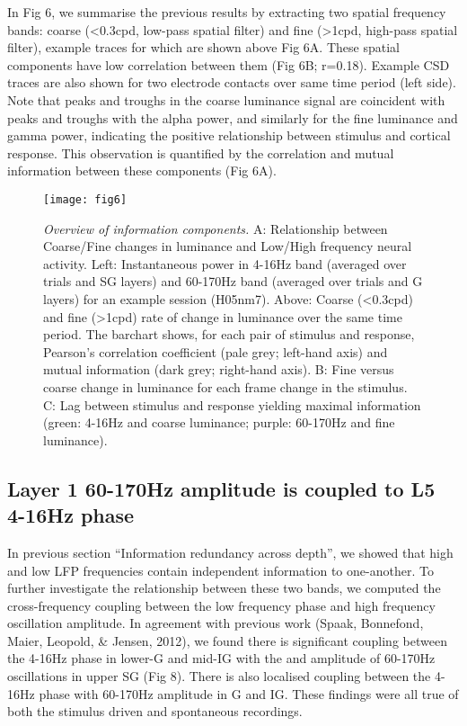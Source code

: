In Fig 6, we summarise the previous results by extracting two spatial frequency bands: coarse ({\textless}0.3cpd, low-pass spatial filter) and fine ({\textgreater}1cpd, high-pass spatial filter), example traces for which are shown above Fig 6A.
These spatial components have low correlation between them (Fig 6B; r=0.18).
Example \ac{CSD} traces are also shown for two electrode contacts over same time period (left side).
Note that peaks and troughs in the coarse luminance signal are coincident with peaks and troughs with the alpha power, and similarly for the fine luminance and gamma power, indicating the positive relationship between stimulus and cortical response.
This observation is quantified by the correlation and mutual information between these components (Fig 6A).

\begin{figure}[htbp]
\centering \texttt{[image: fig6]}
%
\caption{%
\textit{Overview of information components.}
A: Relationship between Coarse/Fine changes in luminance and Low/High frequency neural activity.
Left: Instantaneous power in 4-16Hz band (averaged over trials and \ac{SG} layers) and 60-170Hz band (averaged over trials and \ac{G} layers) for an example session (H05nm7).
Above: Coarse (<0.3cpd) and fine (>1cpd) rate of change in luminance over the same time period.
The barchart shows, for each pair of stimulus and response, Pearson's correlation coefficient (pale grey; left-hand axis) and mutual information (dark grey; right-hand axis).
B: Fine versus coarse change in luminance for each frame change in the stimulus.
C: Lag between stimulus and response yielding maximal information (green: 4-16Hz and coarse luminance; purple: 60-170Hz and fine luminance).}%
\label{fig:lam_6}
%
\end{figure}

\subsection{Layer 1 60-170Hz amplitude is coupled to \ac{L5} 4-16Hz phase}
In previous section ``Information redundancy across depth'', we showed that high and low \ac{LFP} frequencies contain independent information to one-another.
To further investigate the relationship between these two bands, we computed the cross-frequency coupling between the low frequency phase and high frequency oscillation amplitude.
In agreement with previous work (Spaak, Bonnefond, Maier, Leopold, \& Jensen, 2012), we found there is significant coupling between the 4-16Hz phase in lower-\ac{G} and mid-\ac{IG} with the and amplitude of 60-170Hz oscillations in upper \ac{SG} (Fig 8).
There is also localised coupling between the 4-16Hz phase with 60-170Hz amplitude in \ac{G} and \ac{IG}.
These findings were all true of both the stimulus driven and spontaneous recordings.

